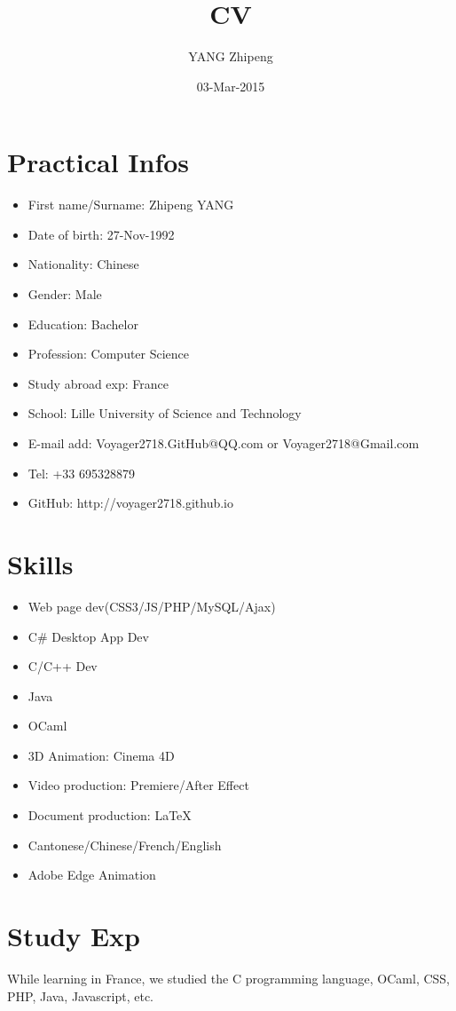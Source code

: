 \documentclass[UTF8]{ctexart}
\title{CV}
\author{YANG Zhipeng}
\date{03-Mar-2015}
\begin{document}
\maketitle
\pagestyle{fancy}
\section{Practical Infos}
\begin{itemize}
\item First name/Surname: Zhipeng YANG
\item Date of birth: 27-Nov-1992
\item Nationality: Chinese
\item Gender: Male
\item Education: Bachelor
\item Profession: Computer Science
\item Study abroad exp: France
\item School: Lille University of Science and Technology
\item E-mail add: Voyager2718.GitHub@QQ.com or Voyager2718@Gmail.com
\item Tel: +33 695328879
\item GitHub: http://voyager2718.github.io
\end{itemize}
\section{Skills}
\begin{itemize}
\item Web page dev(CSS3/JS/PHP/MySQL/Ajax)
\item C\#{} Desktop App Dev
\item C/C++ Dev
\item Java
\item OCaml
\item 3D Animation: Cinema 4D
\item Video production: Premiere/After Effect
\item Document production: \LaTeX
\item Cantonese/Chinese/French/English
\item Adobe Edge Animation
\end{itemize}
\section{Study Exp}
While learning in France, we studied the C programming language, OCaml, CSS, PHP, Java, Javascript, etc.
\end{document}

